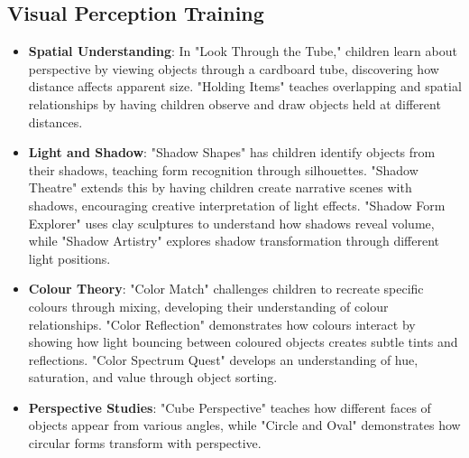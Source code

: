 \documentclass{article}
\begin{document}
\subsection{Visual Perception Training}
\begin{itemize}
    \item \textbf{Spatial Understanding}: In "Look Through the Tube," children learn about perspective by viewing objects through a cardboard tube, discovering how distance affects apparent size. "Holding Items" teaches overlapping and spatial relationships by having children observe and draw objects held at different distances.
    \item \textbf{Light and Shadow}: "Shadow Shapes" has children identify objects from their shadows, teaching form recognition through silhouettes. "Shadow Theatre" extends this by having children create narrative scenes with shadows, encouraging creative interpretation of light effects. "Shadow Form Explorer" uses clay sculptures to understand how shadows reveal volume, while "Shadow Artistry" explores shadow transformation through different light positions.
    \item \textbf{Colour Theory}: "Color Match" challenges children to recreate specific colours through mixing, developing their understanding of colour relationships. "Color Reflection" demonstrates how colours interact by showing how light bouncing between coloured objects creates subtle tints and reflections. "Color Spectrum Quest" develops an understanding of hue, saturation, and value through object sorting.
    \item \textbf{Perspective Studies}: "Cube Perspective" teaches how different faces of objects appear from various angles, while "Circle and Oval" demonstrates how circular forms transform with perspective.
\end{itemize}
\end{document}

